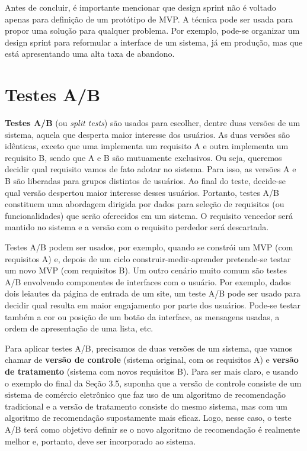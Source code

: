 \documentclass[
  11pt,
  twoside]{book}
\begin{document}
Antes de concluir, é importante mencionar que design sprint não é
voltado apenas para definição de um protótipo de MVP. A técnica pode ser
usada para propor uma solução para qualquer problema. Por exemplo,
pode-se organizar um design sprint para reformular a interface de um
sistema, já em produção, mas que está apresentando uma alta taxa de
abandono.

\hypertarget{testes-ab}{%
\section{Testes A/B}\label{testes-ab}}

 \textbf{Testes A/B} (ou \emph{split tests}) são
usados para escolher, dentre duas versões de um sistema, aquela que
desperta maior interesse dos usuários. As duas versões são idênticas,
exceto que uma implementa um requisito A e outra implementa um requisito
B, sendo que A e B são mutuamente exclusivos. Ou seja, queremos decidir
qual requisito vamos de fato adotar no sistema. Para isso, as versões A
e B são liberadas para grupos distintos de usuários. Ao final do teste,
decide-se qual versão despertou maior interesse desses usuários.
Portanto, testes A/B constituem uma abordagem dirigida por dados para
seleção de requisitos (ou funcionalidades) que serão oferecidos em um
sistema. O requisito vencedor será mantido no sistema e a versão com o
requisito perdedor será descartada.

Testes A/B podem ser usados, por exemplo, quando se constrói um MVP (com
requisitos A) e, depois de um ciclo construir-medir-aprender pretende-se
testar um novo MVP (com requisitos B). Um outro cenário muito comum são
testes A/B envolvendo componentes de interfaces com o usuário. Por
exemplo, dados dois leiautes da página de entrada de um site, um teste
A/B pode ser usado para decidir qual resulta em maior engajamento por
parte dos usuários. Pode-se testar também a cor ou posição de um botão
da interface, as mensagens usadas, a ordem de apresentação de uma lista,
etc.

 
 Para aplicar testes A/B,
precisamos de duas versões de um sistema, que vamos chamar de
\textbf{versão de controle} (sistema original, com os requisitos A) e
\textbf{versão de tratamento} (sistema com novos requisitos B). Para ser
mais claro, e usando o exemplo do final da Seção 3.5, suponha que a
versão de controle consiste de um sistema de comércio eletrônico que faz
uso de um algoritmo de recomendação tradicional e a versão de tratamento
consiste do mesmo sistema, mas com um algoritmo de recomendação
supostamente mais eficaz. Logo, nesse caso, o teste A/B terá como
objetivo definir se o novo algoritmo de recomendação é realmente melhor
e, portanto, deve ser incorporado ao sistema.
\end{document}
